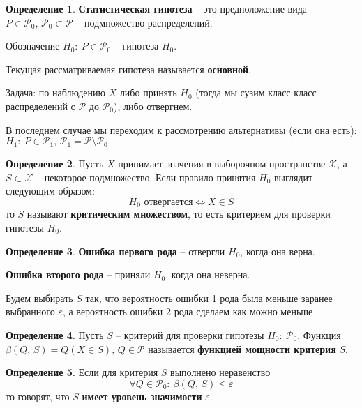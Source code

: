 \documentclass[a4paper,12pt]{article}
\renewcommand{\leq}{\ensuremath{\leqslant}}
\theoremstyle{plain}
\theoremstyle{definition}
\newtheorem{definition}{Определение}[section]
\theoremstyle{remark}
\begin{document}
\begin{definition}
  \textbf{Статистическая гипотеза} -- это предположение вида $P \in \mathcal{P}_0,\, \mathcal{P}_0 \subset \mathcal{P}$ -- подмножество распределений.

  Обозначение $H_0 :\: P \in \mathcal{P}_0$ -- гипотеза $H_0$.

  Текущая рассматриваемая гипотеза называется \textbf{основной}.
\end{definition}

Задача: по наблюдению $X$ либо принять $H_0$ (тогда мы сузим класс класс распределений с $\mathcal{P}$ до $\mathcal{P}_0$), либо отвергнем.

В последнем случае мы переходим к рассмотрению альтернативы (если она есть): $H_1 :\: P \in \mathcal{P}_1,\, \mathcal{P}_1 = \mathcal{P} \setminus \mathcal{P}_0$

\begin{definition}
  Пусть $X$ принимает значения в выборочном пространстве $\mathcal{X}$, а $S \subset \mathcal{X}$ -- некоторое подмножество. Если правило принятия $H_0$ выглядит следующим образом:
  \[
    H_0 \text{ отвергается} \Leftrightarrow X \in S
  \]
  то $S$ называют \textbf{критическим множеством}, то есть критерием для проверки гипотезы $H_0$.
\end{definition}

\begin{definition}
  \textbf{Ошибка первого рода} -- отвергли $H_0$, когда она верна.

  \textbf{Ошибка второго рода} -- приняли $H_0$, когда она неверна.
\end{definition}

Будем выбирать $S$ так, что вероятность ошибки 1 рода была меньше заранее выбранного $\varepsilon$, а вероятность ошибки 2 рода сделаем как можно меньше

\begin{definition}
  Пусть $S$ -- критерий для проверки гипотезы $H_0 :\: \mathcal{P}_0$. Функция $\beta(Q,\,S) = Q(X \in S),\, Q \in \mathcal{P}$ называется \textbf{функцией мощности критерия} $S$.
\end{definition}

\begin{definition}
  Если для критерия $S$ выполнено неравенство 
  \[
    \forall Q \in \mathcal{P}_0 :\: \beta(Q,\, S) \leq \varepsilon
  \]
  то говорят, что $S$ \textbf{имеет уровень значимости} $\varepsilon$.
\end{definition}
\end{document}
